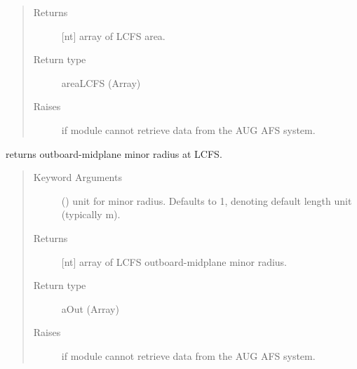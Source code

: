 \documentclass[letterpaper,10pt,english]{sphinxmanual}
\begin{document}
\begin{fulllineitems}
\begin{fulllineitems}
\begin{quote}
\begin{description}
\item[{Returns}] \leavevmode
{[}nt{]} array of LCFS area.

\item[{Return type}] \leavevmode
areaLCFS (Array)

\item[{Raises}] \leavevmode
{} \textendash{} if module cannot retrieve data from the AUG AFS system.

\end{description}\end{quote}

\end{fulllineitems}


\begin{fulllineitems}
\label{\detokenize{eqtools:eqtools.AUGData.AUGDDData.getAOut}}
returns outboard-midplane minor radius at LCFS.
\begin{quote}\begin{description}
\item[{Keyword Arguments}] \leavevmode
{} () \textendash{} unit for minor radius.  Defaults to 1,
denoting default length unit (typically m).

\item[{Returns}] \leavevmode
{[}nt{]} array of LCFS outboard-midplane minor radius.

\item[{Return type}] \leavevmode
aOut (Array)

\item[{Raises}] \leavevmode
{} \textendash{} if module cannot retrieve data from the AUG AFS system.

\end{description}\end{quote}

\end{fulllineitems}



\end{fulllineitems}
\end{document}
